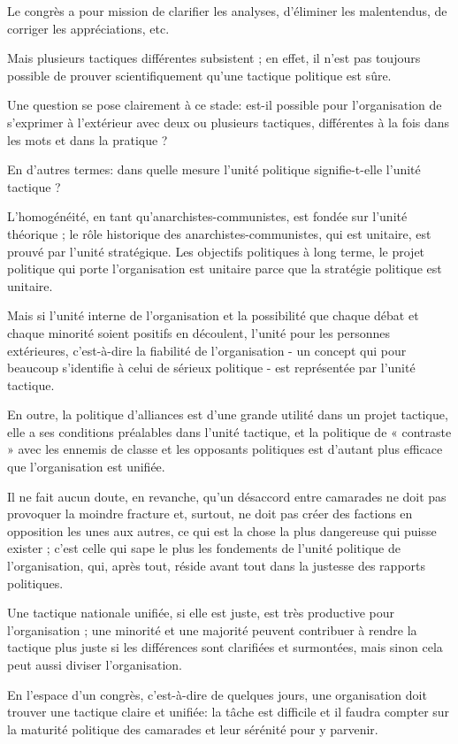 Le congrès a pour mission de clarifier les analyses, d'éliminer les malentendus, de corriger les appréciations, etc.

Mais plusieurs tactiques différentes subsistent ; en effet, il n'est pas toujours possible de prouver scientifiquement qu'une tactique politique est sûre.

Une question se pose clairement à ce stade: est-il possible pour l'organisation de s'exprimer à l'extérieur avec deux ou plusieurs tactiques, différentes à la fois dans les mots et dans la pratique ?

En d'autres termes: dans quelle mesure l'unité politique signifie-t-elle l'unité tactique ?

L'homogénéité, en tant qu'anarchistes-communistes, est fondée sur l'unité théorique ; le rôle historique des anarchistes-communistes, qui est unitaire, est prouvé par l'unité stratégique. Les objectifs politiques à long terme, le projet politique qui porte l'organisation est unitaire parce que la stratégie politique est unitaire.

Mais si l'unité interne de l'organisation et la possibilité que chaque débat et chaque minorité soient positifs en découlent, l'unité pour les personnes extérieures, c'est-à-dire la fiabilité de  l'organisation - un concept qui pour beaucoup s'identifie à celui de sérieux politique - est représentée par l'unité tactique.

En outre, la politique d'alliances est d'une grande utilité dans un projet tactique, elle a ses conditions préalables dans l'unité tactique, et la politique de « contraste » avec les ennemis de classe et les opposants politiques est d'autant plus efficace que l'organisation est unifiée.

Il ne fait aucun doute, en revanche, qu'un désaccord entre camarades ne doit pas provoquer la moindre fracture et, surtout, ne doit pas créer des factions en opposition les unes aux autres, ce qui est la chose la plus dangereuse qui puisse exister ; c'est celle qui sape le plus les fondements de l'unité politique de l'organisation, qui, après tout, réside avant tout dans la justesse des rapports politiques.

Une tactique nationale unifiée, si elle est juste, est très productive pour l'organisation ; une minorité et une majorité peuvent contribuer à rendre la tactique plus juste si les différences sont clarifiées et surmontées, mais sinon cela peut aussi diviser l'organisation.

En l'espace d'un congrès, c'est-à-dire de quelques jours, une organisation doit trouver une tactique claire et unifiée: la tâche est difficile et il faudra compter sur la maturité politique des camarades et leur sérénité pour y parvenir.

